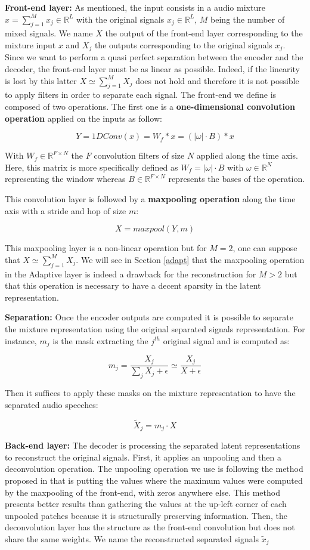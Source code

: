 \documentclass[master, tikz, final,11pt, dvipdfmx]{iscs-thesis}
\begin{document}
\textbf{Front-end layer:}
As mentioned, the input consists in a audio mixture $x = \sum_{j=1}^{M}{x_j} \in \mathbb{R}^L$ with the original signals $x_j \in \mathbb{R}^L$, $M$ being the number of mixed signals. We name $X$ the output of the front-end layer corresponding to the mixture input $x$ and $X_j$ the outputs corresponding to the original signals $x_j$. Since we want to perform a quasi perfect separation between the encoder and the decoder, the front-end layer must be as linear as possible. Indeed, if the linearity is lost by this latter $X \simeq \sum_{j=1}^{M}{X_j}$ does not hold and therefore it is not possible to apply filters in order to separate each signal.
The front-end we define is composed of two operations. The first one is a \textbf{one-dimensional convolution operation} applied on the inputs as follow:

\[Y = 1DConv(x) = W_{f} \ast x = (|\omega| \cdot B) \ast x\]

With $W_f \in \mathbb{R}^{F\times N}$ the $F$ convolution filters of size $N$ applied along the time axis. Here, this matrix is more specifically defined as $W_f = |\omega|\cdot B$ with $\omega \in \mathbb{R}^{N}$ representing the window whereas $B \in \mathbb{R}^{F\times N}$ represents the bases of the operation.

This convolution layer is followed by a \textbf{maxpooling operation} along the time axis with a stride and hop of size $m$:

\[X = maxpool(Y, m)\]

This maxpooling layer is a non-linear operation but for $M = 2$, one can suppose that $X \simeq \sum_{j=1}^{M}{X_j}$. We will see in Section \ref{adapt} that the maxpooling operation in the Adaptive layer is indeed a drawback for the reconstruction for $M > 2$ but that this operation is necessary to have a decent sparsity in the latent representation.

\textbf{Separation:} Once the encoder outputs are computed it is possible to separate the mixture representation using the original separated signals representation. For instance, $m_j$ is the mask extracting the $j^{th}$ original signal and is computed as:

\[m_j = \frac{X_j}{\sum_j{X_j} + \epsilon} \simeq  \frac{X_j}{X + \epsilon}\]

Then it suffices to apply these masks on the mixture representation to have the separated audio speeches:

\[\tilde X _j = m_j \cdot X\]

\textbf{Back-end layer:} The decoder is processing the separated latent representations to reconstruct the original signals. First, it applies an unpooling and then a deconvolution operation. The unpooling operation we use is following the method proposed in \cite{unpool} that is putting the values where the maximum values were computed by the maxpooling of the front-end, with zeros anywhere else. This method presents better results than gathering the values at the up-left corner of each unpooled patches because it is structurally preserving information. Then, the deconvolution layer has the structure as the front-end convolution but does not share the same weights. We name the reconstructed separated signals $\tilde x _j$
\end{document}
